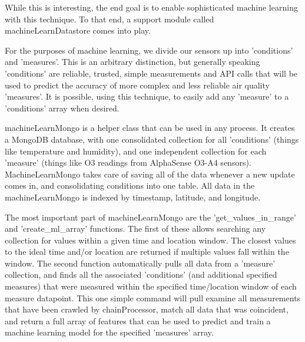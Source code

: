 While this is interesting, the end goal is to enable sophisticated machine learning with this technique.  To that end, a support module called machineLearnDatastore comes into play.

For the purposes of machine learning, we divide our sensors up into 'conditions' and 'measures'.  This is an arbitrary distinction, but generally speaking 'conditions' are reliable, trusted, simple measurements and API calls that will be used to predict the accuracy of more complex and less reliable air quality 'measures'.  It is possible, using this technique, to easily add any 'measure' to a 'conditions' array when desired.

machineLearnMongo is a helper class that can be used in any process.  It creates a MongoDB database, with one consolidated collection for all 'conditions' (things like temperature and humidity), and one independent collection for each 'measure' (things like O3 readings from AlphaSense O3-A4 sensors).  MachineLearnMongo takes care of saving all of the data whenever a new update comes in, and consolidating conditions into one table.  All data in the machineLearnMongo is indexed by timestamp, latitude, and longitude.  

The most important part of machineLearnMongo are the 'get\_values\_in\_range' and 'create\_ml\_array' functions.  The first of these allows searching any collection for values within a given time and location window.  The closest values to the ideal time and/or location are returned if multiple values fall within the window.  The second function automatically pulls all data from a 'measure' collection, and finds all the associated 'conditions' (and additional specified measures) that were measured within the specified time/location window of each measure datapoint.  This one simple command will pull examine all measurements that have been crawled by chainProcessor, match all data that was coincident, and return a full array of features that can be used to predict and train a machine learning model for the specified 'measures' array.
 

